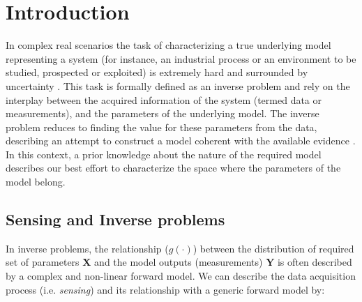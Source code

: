 \chapter{Introduction}
\label{sec_intro}


In complex real scenarios the task of characterizing a true underlying model representing a system (for instance, an industrial process or an environment to be studied, prospected or exploited) is extremely hard and surrounded by uncertainty \cite{cover2006elements}. This task is formally defined as an inverse problem and rely on the interplay between the acquired information of the system (termed data or measurements), and the parameters of the underlying model. The inverse problem reduces to finding the value for these parameters from the data, describing an attempt to construct a model coherent with the available evidence \cite{Santamarina2005_a}. In this context, a prior knowledge about the nature of the required model describes our best effort to characterize the space where the parameters of the model belong.



%
%
%
%


\section{Sensing and Inverse problems}
\label{sec_intro_Base}

In inverse problems, the relationship ($g(\cdot)$) between the distribution of required set of parameters $\mathbf{X}$ and the model outputs (measurements) $\mathbf{Y}$ is often described by a complex and non-linear forward model. We can describe the data acquisition process (i.e. \emph{sensing}) and its relationship with a generic forward model by:

